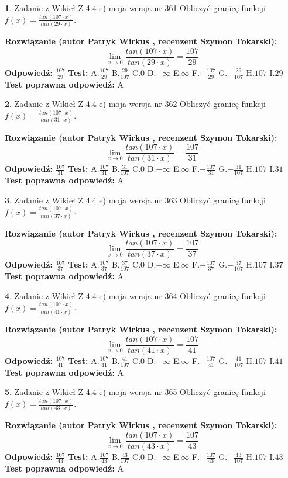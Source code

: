 \documentclass[12pt, a4paper]{article}
\theoremstyle{definition} %
\newtheorem{zad}{}
\newcommand{\zadStart}[1]{\begin{zad}#1\newline}
\newcommand{\zadStop}{\end{zad}}
\newcommand{\rozwStart}[2]{\noindent \textbf{Rozwiązanie (autor #1 , recenzent #2): }\newline}
\newcommand{\rozwStop}{\newline}
\newcommand{\odpStart}{\noindent \textbf{Odpowiedź:}\newline}
\newcommand{\odpStop}{\newline}
\newcommand{\testStart}{\noindent \textbf{Test:}\newline}
\newcommand{\testStop}{\newline}
\newcommand{\kluczStart}{\noindent \textbf{Test poprawna odpowiedź:}\newline}
\newcommand{\kluczStop}{\newline}
\begin{document}
\zadStart{Zadanie z Wikieł Z 4.4 e) moja wersja nr 361}
Obliczyć granicę funkcji $f(x)=\frac{tan(107\cdot x)}{tan(29\cdot x)}$.
\zadStop
\rozwStart{Patryk Wirkus}{Szymon Tokarski}
$$\lim\limits_{x\to 0}\frac{tan(107\cdot x)}{tan(29\cdot x)}=
\frac{107}{29}$$
\rozwStop
\odpStart
$\frac{107}{29}$
\odpStop
\testStart
A.$\frac{107}{29}$
B.$\frac{29}{107}$
C.$0$
D.$-\infty$
E.$\infty$
F.$-\frac{107}{29}$
G.$-\frac{29}{107}$
H.$107$
I.$29$
\testStop
\kluczStart
A
\kluczStop



\zadStart{Zadanie z Wikieł Z 4.4 e) moja wersja nr 362}
Obliczyć granicę funkcji $f(x)=\frac{tan(107\cdot x)}{tan(31\cdot x)}$.
\zadStop
\rozwStart{Patryk Wirkus}{Szymon Tokarski}
$$\lim\limits_{x\to 0}\frac{tan(107\cdot x)}{tan(31\cdot x)}=
\frac{107}{31}$$
\rozwStop
\odpStart
$\frac{107}{31}$
\odpStop
\testStart
A.$\frac{107}{31}$
B.$\frac{31}{107}$
C.$0$
D.$-\infty$
E.$\infty$
F.$-\frac{107}{31}$
G.$-\frac{31}{107}$
H.$107$
I.$31$
\testStop
\kluczStart
A
\kluczStop



\zadStart{Zadanie z Wikieł Z 4.4 e) moja wersja nr 363}
Obliczyć granicę funkcji $f(x)=\frac{tan(107\cdot x)}{tan(37\cdot x)}$.
\zadStop
\rozwStart{Patryk Wirkus}{Szymon Tokarski}
$$\lim\limits_{x\to 0}\frac{tan(107\cdot x)}{tan(37\cdot x)}=
\frac{107}{37}$$
\rozwStop
\odpStart
$\frac{107}{37}$
\odpStop
\testStart
A.$\frac{107}{37}$
B.$\frac{37}{107}$
C.$0$
D.$-\infty$
E.$\infty$
F.$-\frac{107}{37}$
G.$-\frac{37}{107}$
H.$107$
I.$37$
\testStop
\kluczStart
A
\kluczStop



\zadStart{Zadanie z Wikieł Z 4.4 e) moja wersja nr 364}
Obliczyć granicę funkcji $f(x)=\frac{tan(107\cdot x)}{tan(41\cdot x)}$.
\zadStop
\rozwStart{Patryk Wirkus}{Szymon Tokarski}
$$\lim\limits_{x\to 0}\frac{tan(107\cdot x)}{tan(41\cdot x)}=
\frac{107}{41}$$
\rozwStop
\odpStart
$\frac{107}{41}$
\odpStop
\testStart
A.$\frac{107}{41}$
B.$\frac{41}{107}$
C.$0$
D.$-\infty$
E.$\infty$
F.$-\frac{107}{41}$
G.$-\frac{41}{107}$
H.$107$
I.$41$
\testStop
\kluczStart
A
\kluczStop



\zadStart{Zadanie z Wikieł Z 4.4 e) moja wersja nr 365}
Obliczyć granicę funkcji $f(x)=\frac{tan(107\cdot x)}{tan(43\cdot x)}$.
\zadStop
\rozwStart{Patryk Wirkus}{Szymon Tokarski}
$$\lim\limits_{x\to 0}\frac{tan(107\cdot x)}{tan(43\cdot x)}=
\frac{107}{43}$$
\rozwStop
\odpStart
$\frac{107}{43}$
\odpStop
\testStart
A.$\frac{107}{43}$
B.$\frac{43}{107}$
C.$0$
D.$-\infty$
E.$\infty$
F.$-\frac{107}{43}$
G.$-\frac{43}{107}$
H.$107$
I.$43$
\testStop
\kluczStart
A
\kluczStop
\end{document}
